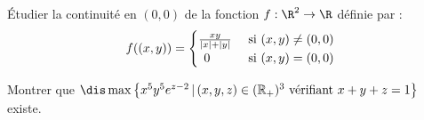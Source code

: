 \documentclass[a4paper,10pt]{report}
\begin{document}
\begin{Exa} Étudier la continuité en $(0,0)$ de la fonction $f : \R^{2} \rightarrow \R$ définie par :
  \[
  f((x,y)) =
  \begin{cases}
    \frac{xy}{\vert x \vert + \vert y \vert} & \hbox{ si } (x,y) \neq (0,0) \\
    \, \; 0 & \hbox{ si } (x,y)=(0,0)
  \end{cases}
  \]
\end{Exa}





\begin{Exa} Montrer que $\dis \max \left\lbrace x^5y^5 e^{z-2} \, \vert \, (x,y,z) \in (\mathbb{R}_+)^3 \hbox{ vérifiant } x+y+z =1 \right\rbrace$ existe.
\end{Exa}
\end{document}
